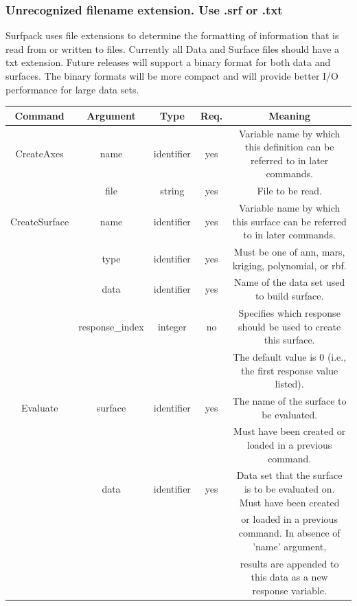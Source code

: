 \documentclass{article}
\begin{document}
\subsubsection{ Unrecognized filename extension.  Use .srf or .txt}
Surfpack uses file extensions to determine the formatting of information that is read from or written to files.  Currently all Data and Surface files should have a txt extension.  Future releases will support a binary format for both data and surfaces.  The binary formats will be more compact and will provide better I/O performance for large data sets.

\appendix

\begin{table}
  \centering
  \begin{tabular}{|c|c|c|c|c|}
    \hline
    \textbf{Command} & \textbf{Argument} & \textbf{Type} &
    \textbf{Req.} & \textbf{Meaning}\\
    \hline
    CreateAxes & name & identifier & yes & Variable name by which
    this definition can be referred to in later commands.\\
    \hline
    & file & string & yes & File to be read.\\
    \hline
    CreateSurface & name & identifier & yes & Variable name by which
    this surface can be referred to in later commands.\\
    \hline
    & type & identifier & yes & Must be one of ann, mars, kriging, polynomial,
    or rbf.\\
    \hline
    & data & identifier & yes & Name of the data set used to
    build surface.\\
    \hline
    & response\_index & integer & no & Specifies which response
    should be used to create this surface.\\
    & & & & The default value is 0 (i.e., the first response value
    listed).\\
    \hline
    Evaluate & surface & identifier & yes & The name of the surface to
    be evaluated.\\
    & & & & Must have been created or loaded in a previous command.\\
    \hline
    & data & identifier & yes & Data set that the surface is to
    be evaluated on.  Must have been created  \\
    & & & & or loaded in a previous command.  In absence of 'name' argument,\\
    & & & & results are appended to this data as a new response variable. \\

\end{tabular}
\end{table}
\end{document}
